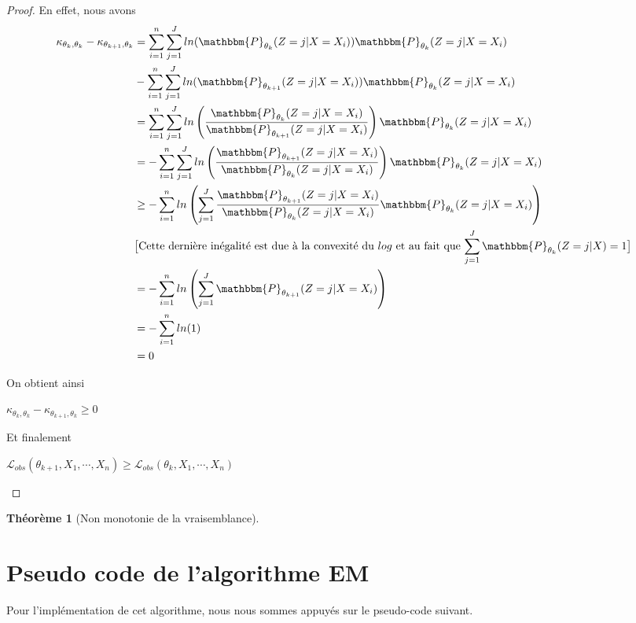 \documentclass[frenchb]{report}
\newcommand{\1}{\mathbbm{1}}
\newcommand{\prob}{\mathbbm{P}}
\newcommand{\lv}{\mathcal{L}}
\newtheorem{thm}{Théorème}
\theoremstyle{definition}\newtheorem{defn}{Définition}
\theoremstyle{definition}\newtheorem{exm}{Exemple}
\theoremstyle{definition}\newtheorem{nota}{Notation}
\theoremstyle{definition}\newtheorem{rem}{Remarque}
\begin{document}
\begin{proof}
En effet, nous avons
\begin{align*}
\kappa_{\theta_{k}, \theta_k}-\kappa_{\theta_{k+1}, \theta_k} &= \sum_{i=1}^n\sum_{j=1}^J ln(\prob_{\theta_k}(Z = j|X=X_i))\prob_{\theta_k}(Z = j|X = X_i) \\
&- \sum_{i=1}^n \sum_{j=1}^J ln(\prob_{\theta_{k+1}}(Z = j|X=X_i))\prob_{\theta_k}(Z = j|X = X_i) \\
&= \sum_{i=1}^n \sum_{j=1}^J ln\left(\frac{\prob_{\theta_k}(Z = j|X=X_i)}{\prob_{\theta_{k+1}}(Z = j|X=X_i)}\right)\prob_{\theta_k}(Z = j|X = X_i)\\
&= - \sum_{i=1}^n \sum_{j=1}^J ln\left(\frac{\prob_{\theta_{k+1}}(Z = j|X=X_i)}{\prob_{\theta_k}(Z = j|X=X_i)}\right)\prob_{\theta_k}(Z = j|X = X_i)\\
&\geq - \sum_{i=1}^n ln\left(\sum_{j=1}^J \frac{\prob_{\theta_{k+1}}(Z = j|X=X_i)}{\prob_{\theta_k}(Z = j|X=X_i)}\prob_{\theta_k}(Z = j|X = X_i) \right)\\
&\text{$\big[$Cette dernière inégalité est due à la convexité du $log$ et au fait que $\displaystyle\sum_{j=1}^J\prob_{\theta_k}(Z = j|X)=1\big]$}\\
&= - \sum_{i=1}^n ln\left(\sum_{j=1}^J\prob_{\theta_{k+1}}(Z = j|X=X_i)\right)\\
&=  - \sum_{i=1}^n ln(1)\\
&= 0
\end{align*}


On obtient ainsi

\begin{center} $\kappa_{\theta_{k}, \theta_k}-\kappa_{\theta_{k+1}, \theta_k} \geq 0$ \end{center}


Et finalement
\begin{center} $\lv_{obs}(\theta_{k+1}, X_1, \cdots, X_n) \geq \lv_{obs}(\theta_k, X_1, \cdots, X_n)$ \end{center}

\end{proof}


\begin{thm}[Non monotonie de la vraisemblance]

\end{thm}

\newpage

\section{Pseudo code de l'algorithme EM}
Pour l'implémentation de cet algorithme, nous nous sommes appuyés sur le pseudo-code suivant.
\end{document}
